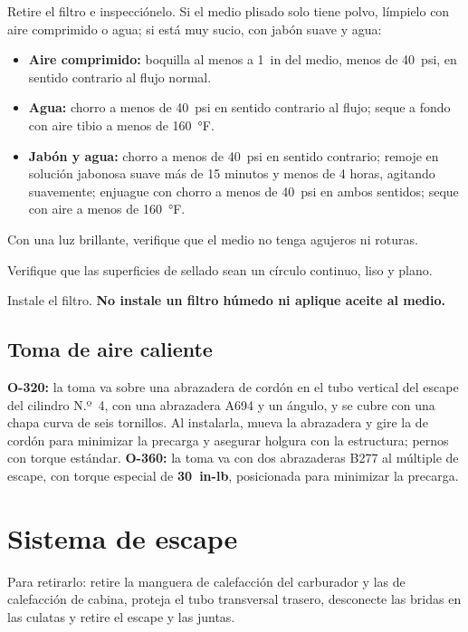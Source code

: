 \begin{pasos}
\item Retire el filtro e inspecciónelo. Si el medio plisado solo tiene polvo, límpielo con aire comprimido o agua; si está muy sucio, con jabón suave y agua:
\begin{itemize}
\item \textbf{Aire comprimido:} boquilla al menos a 1~in del medio, menos de 40~psi, en sentido contrario al flujo normal.
\item \textbf{Agua:} chorro a menos de 40~psi en sentido contrario al flujo; seque a fondo con aire tibio a menos de 160~°F.
\item \textbf{Jabón y agua:} chorro a menos de 40~psi en sentido contrario; remoje en solución jabonosa suave más de 15 minutos y menos de 4 horas, agitando suavemente; enjuague con chorro a menos de 40~psi en ambos sentidos; seque con aire a menos de 160~°F.
\end{itemize}
\item Con una luz brillante, verifique que el medio no tenga agujeros ni roturas.
\item Verifique que las superficies de sellado sean un círculo continuo, liso y plano.
\item Instale el filtro. \textbf{No instale un filtro húmedo ni aplique aceite al medio.}
\end{pasos}

\subsection{Toma de aire caliente}

\textbf{O-320:} la toma va sobre una abrazadera de cordón en el tubo vertical del escape del cilindro N.º~4, con una abrazadera A694 y un ángulo, y se cubre con una chapa curva de seis tornillos. Al instalarla, mueva la abrazadera y gire la de cordón para minimizar la precarga y asegurar holgura con la estructura; pernos con torque estándar. \textbf{O-360:} la toma va con dos abrazaderas B277 al múltiple de escape, con torque especial de \textbf{30~in-lb}, posicionada para minimizar la precarga.

\section{Sistema de escape}

Para retirarlo: retire la manguera de calefacción del carburador y las de calefacción de cabina, proteja el tubo transversal trasero, desconecte las bridas en las culatas y retire el escape y las juntas.

